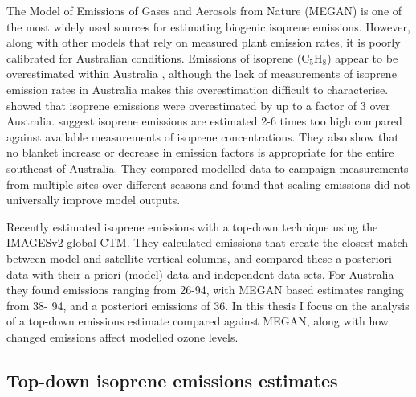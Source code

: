     The Model of Emissions of Gases and Aerosols from Nature (MEGAN) is one of the most widely used sources for estimating biogenic isoprene emissions.
    However, along with other models that rely on measured plant emission rates, it is poorly calibrated for Australian conditions.
    Emissions of isoprene (C$_5$H$_8$) appear to be overestimated within Australia \parencite{Sindelarova2014,Stavrakou2014,Emmerson2016}, although the lack of measurements of isoprene emission rates in Australia makes this overestimation difficult to characterise.
    \textcite{Bauwens2016} showed that isoprene emissions were overestimated by up to a factor of 3 over Australia.
    \textcite{Emmerson2016} suggest isoprene emissions are estimated 2-6 times too high compared against available measurements of isoprene concentrations.
    They also show that no blanket increase or decrease in emission factors is appropriate for the entire southeast of Australia.
    They compared modelled data to campaign measurements from multiple sites over different seasons and found that scaling emissions did not universally improve model outputs.
    

    Recently \textcite{Bauwens2016} estimated isoprene emissions with a top-down technique using the IMAGESv2 global CTM.
    They calculated emissions that create the closest match between model and satellite vertical columns, and compared these a posteriori data with their a priori (model) data and independent data sets.
    For Australia they found emissions ranging from 26-94\tgcpyr, with MEGAN based estimates ranging from 38\tgcpyr - 94\tgcpyr, and a posteriori emissions of 36\tgcpyr.
    In this thesis I focus on the analysis of a top-down emissions estimate compared against MEGAN, along with how changed emissions affect modelled ozone levels.
  
  \subsection{Top-down isoprene emissions estimates}
    \label{BioIsop:intro:top_down_estimates}
    
